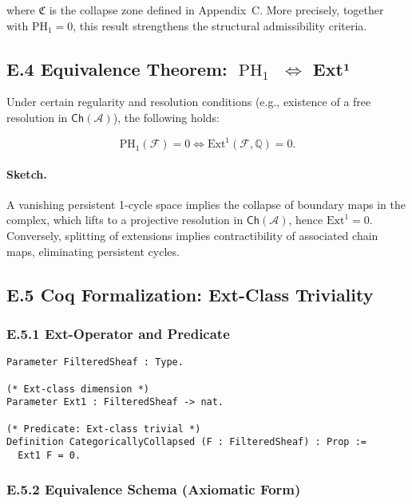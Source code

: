 \documentclass[11pt]{article}
\DeclareMathOperator{\PH}{PH}
\begin{document}
where \( \mathfrak{C} \) is the collapse zone defined in Appendix~C. More precisely, together with \( \mathrm{PH}_1 = 0 \), this result strengthens the structural admissibility criteria.

\subsection*{E.4 Equivalence Theorem: \(\PH_1\) \( \iff \) Ext¹}

Under certain regularity and resolution conditions (e.g., existence of a free resolution in \( \mathsf{Ch}(\mathcal{A}) \)), the following holds:

\[
\mathrm{PH}_1(\mathcal{F}) = 0 \iff \mathrm{Ext}^1(\mathcal{F}, \mathbb{Q}) = 0.
\]

\paragraph{Sketch.}  
A vanishing persistent 1-cycle space implies the collapse of boundary maps in the complex, which lifts to a projective resolution in \( \mathsf{Ch}(\mathcal{A}) \), hence \( \mathrm{Ext}^1 = 0 \). Conversely, splitting of extensions implies contractibility of associated chain maps, eliminating persistent cycles.

\subsection*{E.5 Coq Formalization: Ext-Class Triviality}

\subsubsection*{E.5.1 Ext-Operator and Predicate}

\begin{lstlisting}[language=Coq, caption=Ext¹-Triviality Predicate, captionpos=b]
Parameter FilteredSheaf : Type.

(* Ext-class dimension *)
Parameter Ext1 : FilteredSheaf -> nat.

(* Predicate: Ext-class trivial *)
Definition CategoricallyCollapsed (F : FilteredSheaf) : Prop :=
  Ext1 F = 0.
\end{lstlisting}

\subsubsection*{E.5.2 Equivalence Schema (Axiomatic Form)}
\end{document}
